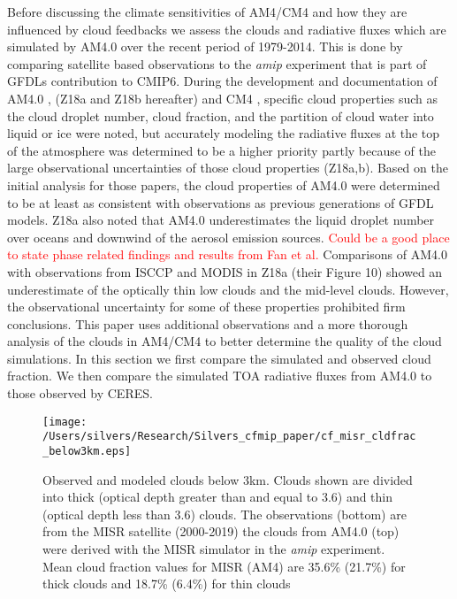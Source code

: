 \documentclass[draft]{agujournal2019}
\begin{document}
Before discussing the climate sensitivities of AM4/CM4 and how they are influenced by cloud feedbacks we assess
the clouds and radiative fluxes which are simulated by AM4.0 over the recent period of 1979-2014.  This is done 
by comparing satellite based observations to the \textit{amip} experiment that is part of GFDLs 
contribution to CMIP6.  
During the development and documentation of AM4.0 \cite{Zhao_etal_2018a, Zhao_etal_2018b}, 
(Z18a and Z18b hereafter) 
and CM4 \cite{Held_etal_2019}, specific cloud properties such as the 
cloud droplet number, cloud fraction, and the partition of cloud water into liquid or ice were noted, but 
accurately modeling the radiative fluxes at the top of the atmosphere was determined to be a 
higher priority partly because of the large observational uncertainties of those cloud properties (Z18a,b).   
Based on the initial analysis for those papers, the cloud properties of AM4.0 were determined to be
at least as consistent with observations as previous generations of GFDL models.  Z18a also noted 
that AM4.0 underestimates the liquid droplet number over oceans and downwind of the aerosol emission 
sources.    \textcolor{red}{Could be a good place to state phase related findings and results from Fan et al.}
Comparisons of AM4.0 with observations from ISCCP and MODIS in Z18a (their Figure 10) showed an underestimate of 
the optically thin low clouds and the mid-level clouds.  
However, the observational uncertainty for some of these properties prohibited firm conclusions.  This paper
uses additional observations and a more thorough analysis of the clouds in AM4/CM4 to better determine 
the quality of the cloud simulations.        
In this section we first compare the simulated and observed cloud fraction.  We then compare  
the simulated TOA radiative fluxes from AM4.0 to those observed by CERES.    


\begin{figure}
  \centering
  \texttt{[image: /Users/silvers/Research/Silvers\_cfmip\_paper/cf\_misr\_cldfrac\_below3km.eps]}
  \caption{Observed and modeled clouds below 3km.  Clouds shown are divided into thick 
  (optical depth greater than and equal to 3.6) and thin (optical depth less than 3.6) 
  clouds.  The observations (bottom) are from the MISR satellite (2000-2019) the clouds from AM4.0 (top) were derived 
  with the MISR simulator in the \textit{amip} experiment. Mean cloud fraction values for MISR 
  (AM4) are 35.6\% (21.7\%) for thick clouds and 18.7\% (6.4\%) for thin clouds}
  \label{fig:cf_misr_lowcl}
\end{figure}
\end{document}
